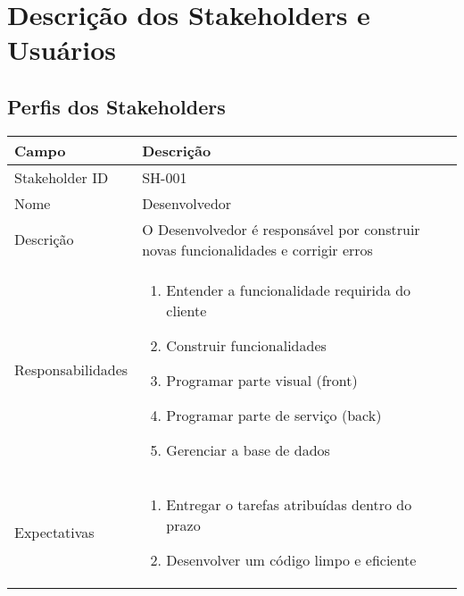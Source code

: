 \chapter{Descrição dos Stakeholders e Usuários}

\section{Perfis dos Stakeholders}

\begin{tabularx}{\textwidth}{| l | X |}
    \hline
    Campo             & Descrição                                                                                                                                                                           \\ \hline
    
    Stakeholder ID    & SH-001                                                                                                                                                                              \\ \hline
    
    Nome              & Desenvolvedor                                                                                                                                                                       \\ \hline
    
    Descrição         & O Desenvolvedor é responsável por construir novas funcionalidades e corrigir erros
    \\ \hline
  
    Responsabilidades & 
    \begin{enumerate}
        \item Entender a funcionalidade requirida do cliente
        \item Construir funcionalidades
        \item Programar parte visual (\Gls{front})
        \item Programar parte de serviço (\Gls{back})
        \item Gerenciar a base de dados
    \end{enumerate}

    \\ \hline
    Expectativas      & 
    \begin{enumerate}
        \item Entregar o tarefas atribuídas dentro do prazo
        \item Desenvolver um código limpo e eficiente
    \end{enumerate}
    

\end{tabularx}
